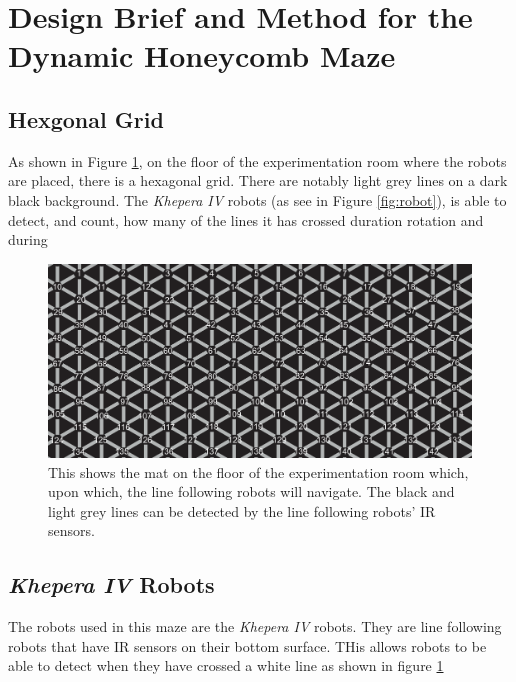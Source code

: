 \section{Design Brief and Method for the Dynamic Honeycomb Maze}

\subsection{Hexgonal Grid}

As shown in Figure \ref{fig:hexgrid_with_numbers}, on the floor of the experimentation room where the robots are placed, there is a hexagonal grid. There are notably light grey lines on a dark black background. The \textit{Khepera IV} robots (as see in Figure \ref{fig:robot}), is able to detect, and count, how many of the lines it has crossed duration rotation and during  

\begin{figure}
    \centering
    \includegraphics[scale = 0.3]{images/hexgrid_with_numbers.png}
    \caption{This shows the mat on the floor of the experimentation room which, upon which, the line following robots will navigate. The black and light grey lines can be detected by the line following robots' IR sensors.}
    \label{fig:hexgrid_with_numbers}
\end{figure}

\subsection{\textit{Khepera IV} Robots}


The robots used in this maze are the \textit{Khepera IV} robots. They are line following robots that have IR sensors on their bottom surface. THis allows robots to be able to detect when they have crossed a white line as shown in figure \ref{fig:hexgrid_with_numbers}

